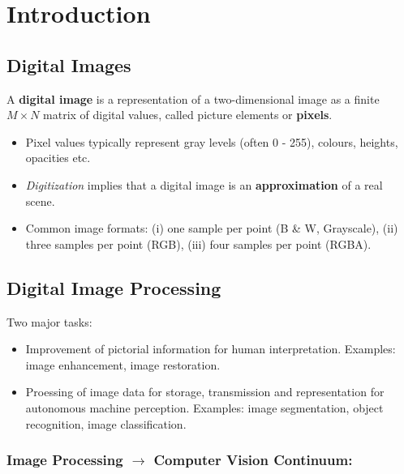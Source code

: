\section*{Introduction}

\subsection*{Digital Images}

A \textbf{digital image} is a representation of a two-dimensional
image as a finite $M \times N$ matrix of digital values, called
picture elements or \textbf{pixels}.

\begin{itemize}
  \item Pixel values typically represent gray levels (often 0 - 255),
    colours, heights, opacities etc.
  \item \textit{Digitization} implies that a digital image is an
    \textbf{approximation} of a real scene.
  \item Common image formats: (i) one sample per point (B \& W,
    Grayscale), (ii) three samples per point (RGB), (iii) four
    samples per point (RGBA).
\end{itemize}

\subsection*{Digital Image Processing}

Two major tasks:

\begin{itemize}
  \item Improvement of pictorial information for human
    interpretation. Examples: image enhancement, image restoration.
  \item Proessing of image data for storage, transmission and
    representation for autonomous machine perception. Examples: image
    segmentation, object recognition, image classification.
\end{itemize}

\subsubsection*{Image Processing $\rightarrow$ Computer Vision Continuum:}

